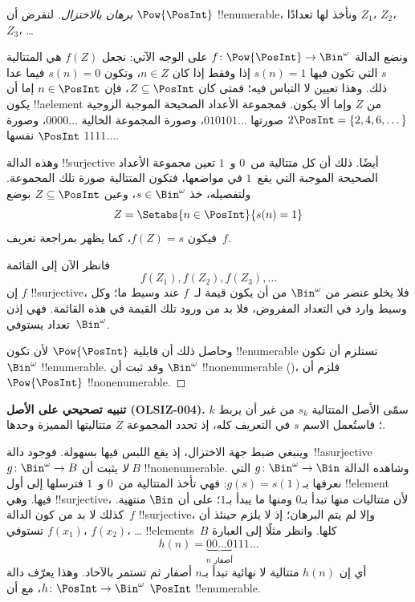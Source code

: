 \documentclass[../../../include/open-logic-section]{subfiles}
\begin{document}
\begin{proof}[برهان {} بالاختزال]
لنفرض أن $\Pow{\PosInt}$ !!{enumerable}، ونأخذ لها تعدادًا $Z_{1}$، $Z_{2}$، $Z_{3}$، \dots

ونضع الدالة $f \colon \Pow{\PosInt} \to \Bin^\omega$ على الوجه الآتي: نجعل $f(Z)$ هي المتتالية $s$ التي تكون فيها $s(n) = 1$ إذا وفقط إذا كان $n \in Z$، وتكون $s(n) = 0$ فيما عدا ذلك. وهذا تعيين لا التباس فيه؛ فمتى كان $Z \subseteq \PosInt$، فإن $n \in \PosInt$ إما أن يكون !!a{element} من $Z$ وإما ألا يكون. فمجموعة الأعداد الصحيحة الموجبة الزوجية $2\PosInt = \{2,
4, 6, \dots\}$ صورتها $010101\dots$، وصورة المجموعة الخالية $0000\dots$، وصورة $\PosInt$ نفسها $1111\dots$.

وهذه الدالة !!{surjective} أيضًا. ذلك أن كل متتالية من~$0$ و~$1$ تعين مجموعة الأعداد الصحيحة الموجبة التي يقع~$1$ في مواضعها، فتكون المتتالية صورة تلك المجموعة. ولتفصيله، خذ $s \in \Bin^\omega$، وعين $Z
\subseteq \PosInt$ بوضع
\[
Z = \Setabs{n \in \PosInt}{s(n) = 1}
\]
فيكون $f(Z) = s$، كما يظهر بمراجعة تعريف~$f$.

فانظر الآن إلى القائمة
\[
f(Z_1), f(Z_2), f(Z_3), \dots
\]
إن $f$ !!{surjective}، فلا يخلو عنصر من $\Bin^\omega$ من أن يكون قيمة لـ~$f$ عند وسيط ما؛ وكل وسيط وارد في التعداد المفروض، فلا بد من ورود تلك القيمة في هذه القائمة. فهي إذن تعداد يستوفي~$\Bin^\omega$.

وحاصل ذلك أن قابلية $\Pow{\PosInt}$ لأن تكون !!{enumerable} تستلزم أن تكون $\Bin^\omega$ !!{enumerable}. وقد ثبت أن $\Bin^\omega$ !!{nonenumerable} ()، فلزم أن $\Pow{\PosInt}$ !!{nonenumerable}.
\end{proof}

\begin{editorial}
\textbf{تنبيه تصحيحي على الأصل (OLSIZ-004).}
سمّى الأصل المتتالية $s_k$ من غير أن يربط $k$؛ فاستُعمل الاسم
$s$ في التعريف كله، إذ تحدد المجموعة $Z$ متتاليتها المميزة وحدها.
\end{editorial}

\begin{explain}
وينبغي ضبط جهة الاختزال، إذ يقع اللبس فيها بسهولة. فوجود دالة~!!a{surjective} $g \colon \Bin^\omega \to B$ \emph{لا} يثبت أن $B$ !!{nonenumerable}. وشاهده الدالة $g
\colon \Bin^\omega \to \Bin$ التي نعرفها بـ$g(s) = s(1)$: فهي تأخذ المتتالية من~$0$ و~$1$ فترسلها إلى أول !!{element} فيها. وهي !!{surjective}، لأن متتاليات منها تبدأ بـ$0$ ومنها ما يبدأ بـ$1$؛ على أن $\Bin$ منتهية. كذلك لا بد من كون الدالة~$f$ !!{surjective}، وإلا لم يتم البرهان؛ إذ لا يلزم حينئذ أن تستوفي $f(x_1)$، $f(x_2)$، \dots{} !!{element}s~$B$ كلها. وانظر مثلًا إلى العبارة
\[
h(n) = \underbrace{00\dots0}_{\text{$n$ أصفار}}111\dots
\]
أي إن $h(n)$ متتالية لا نهائية تبدأ بـ$n$ أصفار ثم تستمر بالآحاد.
وهذا يعرّف دالة $h\colon \PosInt \to \Bin^\omega$، مع أن
$\PosInt$ !!{enumerable}.
\end{explain}
\end{document}
